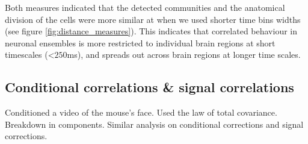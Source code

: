\documentclass[a4paper,12pt]{article}
\theoremstyle{definition}
\begin{document}
  Both measures indicated that the detected communities and the anatomical division of the cells were more similar at when we used shorter time bins widths (see figure \ref{fig:distance_measures}). This indicates that correlated behaviour in neuronal ensembles is more restricted to individual brain regions at short timescales (<$250$ms), and spreads out across brain regions at longer time scales.

  \subsection{Conditional correlations \& signal correlations}
  Conditioned a video of the mouse's face.
  Used the law of total covariance. Breakdown in components.
  Similar analysis on conditional corrections and signal corrections.
\end{document}
